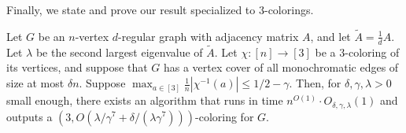 Finally, we state and prove our result specialized to $3$-colorings.

\begin{theorem}
\label{thm:3alg}
Let $G$ be an $n$-vertex $d$-regular graph with adjacency matrix $A$, and let $\tilde{A} = \frac{1}{d}A$.
Let $\lambda$ be the second largest eigenvalue of $\tilde{A}$.
Let $\chi: [n] \to [3]$ be a $3$-coloring of its vertices, and suppose that $G$ has a vertex cover of all monochromatic edges of size at most $\delta n$.
Suppose $\max_{a \in [3]} \frac{1}{n} |\chi^{-1}(a)| \leq 1/2 - \gamma$.
Then, for $\delta, \gamma, \lambda > 0$ small enough, there exists an algorithm that runs in time $n^{O(1)} \cdot O_{\delta,\gamma,\lambda}(1)$ and outputs a $(3, O(\lambda/\gamma^7+\delta/(\lambda\gamma^7)))$-coloring for $G$.
\end{theorem}
